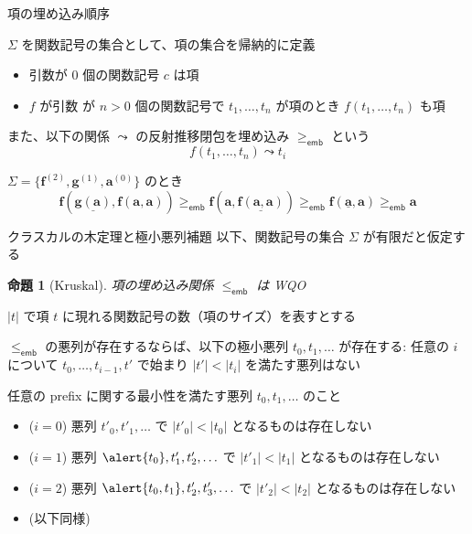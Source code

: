 \documentclass{beamer}
\newtheorem{prop}{命題}
\newcommand{\emb}{\mathsf{emb}}
\newcommand{\m}[1]{\mathbf{#1}}
\begin{document}
\begin{frame}{項の埋め込み順序}
\begin{definition}
$\Sigma$ を関数記号の集合として、\alert{項}の集合を帰納的に定義
\begin{itemize}
    \item 引数が $0$ 個の関数記号 $c$ は項
    \item $f$ が引数 が $n > 0$ 個の関数記号で $t_1, \ldots, t_n$ が項のとき
    $f(t_1, \ldots, t_n)$ も項
\end{itemize}
また、以下の関係 $\leadsto$ の反射推移閉包を\alert{埋め込み} $\geqslant_\emb$ という
\[
f(t_1, \ldots, t_n) \leadsto t_i
\]
\end{definition}
\begin{example}
$\Sigma = \{ \m{f}^{(2)}, \m{g}^{(1)}, \m{a}^{(0)} \}$ のとき
\[
\m{f}(\underline{\m{g}(\m{a})}, \m{f}(\m{a}, \m{a}))
\geqslant_\emb
\m{f}(\m{a}, \underline{\m{f}(\m{a}, \m{a})})
\geqslant_\emb
\m{f}(\underline{\m{a}}, \m{a})
\geqslant_\emb
\m{a}
\]
\end{example}
\end{frame}

\begin{frame}{クラスカルの木定理と極小悪列補題}
以下、関数記号の集合 $\Sigma$ が有限だと仮定する
\begin{prop}[Kruskal]
項の埋め込み関係 $\leqslant_\emb$ は WQO
\end{prop}
\vfill
\pause
$|t|$ で項 $t$ に現れる関数記号の数（項のサイズ）を表すとする
\begin{lemma}[極小悪列補題]
$\leqslant_\emb$ の悪列が存在するならば、以下の\alert{極小悪列} $t_0, t_1, \ldots$ が存在する:
任意の $i$ について $t_0, \ldots, t_{i-1}, t'$ で始まり $|t'| < |t_i|$ を満たす悪列はない
\end{lemma}
\pause
\vfill
任意の prefix に関する最小性を満たす悪列 \alert{$t_0, t_1, \ldots$} のこと
\begin{itemize}
\item[] ($i = 0$) 悪列 $t'_0, t'_1, \ldots$ で $|t'_0| < |t_0|$ となるものは存在しない \pause
\item[] ($i = 1$) 悪列 $\alert{t_0}, t'_1, t'_2, \ldots$ で $|t'_1| < |t_1|$ となるものは存在しない \pause
\item[] ($i = 2$) 悪列 $\alert{t_0, t_1}, t'_2, t'_3,\ldots$ で $|t'_2| < |t_2|$ となるものは存在しない \pause
\item[] (以下同様)
 \end{itemize}
\end{frame}
\end{document}
